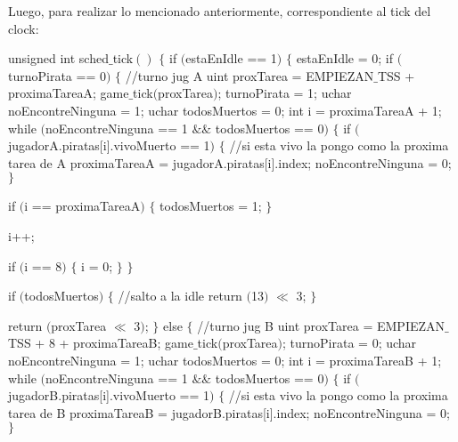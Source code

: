 Luego, para realizar lo mencionado anteriormente, correspondiente al tick del clock:

\begin{algorithmic}
\State \tab unsigned int sched$\_$tick$()$ $\{$
\State \tab \tab  if $($estaEnIdle == 1$)$ $\{$
\State \tab \tab  \tab    estaEnIdle = 0;
\State \tab \tab  \tab    if $($turnoPirata == 0$)$ $\{$
\State \tab \tab  \tab \tab      //turno jug A
\State \tab \tab  \tab \tab      uint proxTarea = EMPIEZAN$\_$TSS + proximaTareaA;
\State \tab \tab  \tab \tab      game$\_$tick$($proxTarea$)$;
\State \tab \tab  \tab \tab      turnoPirata = 1;
\State \tab \tab  \tab \tab      uchar noEncontreNinguna = 1;
\State \tab \tab  \tab \tab      uchar todosMuertos = 0;
\State \tab \tab  \tab \tab      int i = proximaTareaA + 1;
\State \tab \tab  \tab \tab      while $($noEncontreNinguna == 1 $\&\&$ todosMuertos == 0$)$ $\{$
    \State \tab \tab  \tab \tab \tab    if $($jugadorA.piratas[i].vivoMuerto == 1$)$ $\{$
          \State \tab \tab  \tab \tab \tab \tab //si esta vivo la pongo como la proxima tarea de A
          \State \tab \tab  \tab \tab \tab \tab proximaTareaA = jugadorA.piratas[i].index;
          \State \tab \tab  \tab \tab \tab \tab noEncontreNinguna = 0;
    \State \tab \tab  \tab \tab \tab    $\}$

    \State \tab \tab  \tab \tab \tab    if $($i == proximaTareaA$)$ $\{$
          \newline todosMuertos = 1;
    \State \tab \tab  \tab \tab \tab    $\}$

    \State \tab \tab  \tab \tab \tab    i++;

    \State \tab \tab  \tab \tab \tab    if $($i == 8$)$ $\{$
         \State \tab \tab  \tab \tab \tab \tab  i = 0;
    \State \tab \tab  \tab \tab \tab    $\}$
\State \tab \tab  \tab \tab      $\}$

\State \tab \tab  \tab \tab      if $($todosMuertos$)$ $\{$
        //salto a la idle
      \State \tab \tab  \tab \tab \tab  return $($13$)$ $\ll$ 3;
\State \tab \tab  \tab \tab      $\}$

\State \tab \tab  \tab \tab      return $($proxTarea $\ll$ 3$)$;
\State \tab \tab  \tab    $\}$ else $\{$
 \State \tab \tab  \tab \tab     //turno jug B
 \State \tab \tab  \tab \tab     uint proxTarea = EMPIEZAN$\_$TSS + 8 + proximaTareaB;
 \State \tab \tab  \tab \tab     game$\_$tick$($proxTarea$)$;
 \State \tab \tab  \tab \tab     turnoPirata = 0;
 \State \tab \tab  \tab \tab     uchar noEncontreNinguna = 1;
 \State \tab \tab  \tab \tab     uchar todosMuertos = 0;
 \State \tab \tab  \tab \tab     int i = proximaTareaB + 1;
 \State \tab \tab  \tab \tab     while $($noEncontreNinguna == 1 $\&\&$ todosMuertos == 0$)$ $\{$
   \State \tab \tab  \tab \tab \tab     if $($jugadorB.piratas[i].vivoMuerto == 1$)$ $\{$
          //si esta vivo la pongo como la proxima tarea de B
          proximaTareaB = jugadorB.piratas[i].index;
          noEncontreNinguna = 0;
   \State \tab \tab  \tab \tab \tab     $\}$


\end{algorithmic}
